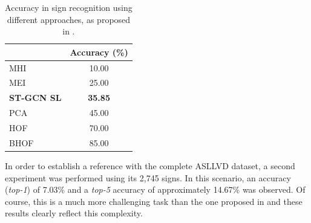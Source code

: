 
\begin{table}[ht]
\centering
\caption{Accuracy in sign recognition using different approaches, as proposed in \cite{lim-2016}.}
\label{tab:results-comparison-20}
\begin{tabular}{lc}
\hline
                   & Accuracy (\%)  \\ \hline
MHI                & 10.00                     \\
MEI                & 25.00                     \\
\textbf{ST-GCN SL} & \textbf{35.85}            \\
PCA                & 45.00                     \\
HOF                & 70.00                     \\
BHOF               & 85.00                     \\ \hline
\end{tabular}
\end{table}



In order to establish a reference with the complete ASLLVD dataset, a second experiment was performed using its 2,745 signs. In this scenario, an accuracy (\textit{top-1}) of 7.03\% and a \textit{top-5} accuracy of approximately 14.67\% was observed. Of course, this is a much more challenging task than the one proposed in \cite{lim-2016} and these results clearly reflect this complexity.


